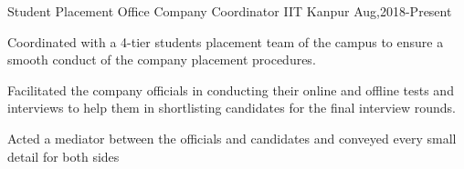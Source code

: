 

\begin{cventries}

  \cventry
  {Student Placement Office}
    {Company Coordinator}
  {IIT Kanpur}
  {Aug,2018-Present}
  {
    \begin{cvitems}
    \item   Coordinated with a 4-tier students placement team of the campus to ensure a smooth conduct of the
            company placement procedures.
    \item   Facilitated the company officials in conducting their online and offline tests and interviews to help them in shortlisting candidates for the final interview rounds.
    \item   Acted a mediator between the officials and candidates and conveyed every small detail for both sides
    \end{cvitems}
  }
  \cventry
 
\end{cventries}

